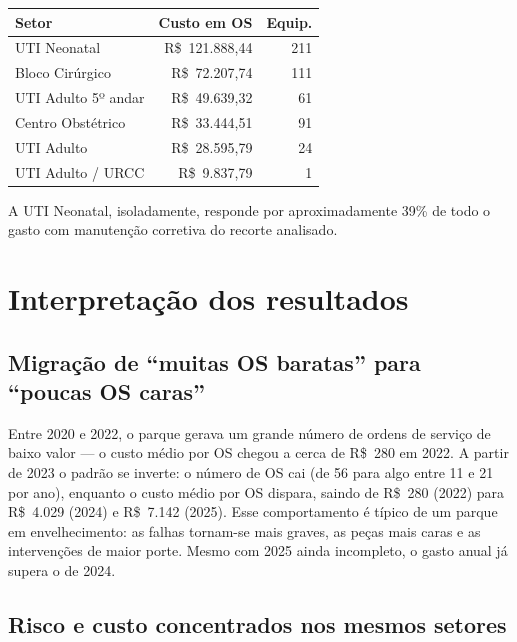 \begin{table}[H]
    \centering
    \begin{tabular}{lrr}
        \hline
        \textbf{Setor} & \textbf{Custo em OS} & \textbf{Equip.} \\
        \hline
        UTI Neonatal & R\$~121.888,44 & 211 \\
        Bloco Cirúrgico & R\$~72.207,74 & 111 \\
        UTI Adulto 5º andar & R\$~49.639,32 & 61 \\
        Centro Obstétrico & R\$~33.444,51 & 91 \\
        UTI Adulto & R\$~28.595,79 & 24 \\
        UTI Adulto / URCC & R\$~9.837,79 & 1 \\
        \hline
    \end{tabular}
\end{table}

A UTI Neonatal, isoladamente, responde por aproximadamente 39\% de todo o gasto
com manutenção corretiva do recorte analisado.

\section{Interpretação dos resultados}

\subsection*{Migração de ``muitas OS baratas'' para ``poucas OS caras''}

Entre 2020 e 2022, o parque gerava um grande número de ordens de serviço de baixo
valor --- o custo médio por OS chegou a cerca de R\$~280 em 2022. A partir de 2023
o padrão se inverte: o número de OS cai (de 56 para algo entre 11 e 21 por ano),
enquanto o custo médio por OS dispara, saindo de R\$~280 (2022) para R\$~4.029
(2024) e R\$~7.142 (2025). Esse comportamento é típico de um parque em
envelhecimento: as falhas tornam-se mais graves, as peças mais caras e as
intervenções de maior porte. Mesmo com 2025 ainda incompleto, o gasto anual já
supera o de 2024.

\subsection*{Risco e custo concentrados nos mesmos setores}

